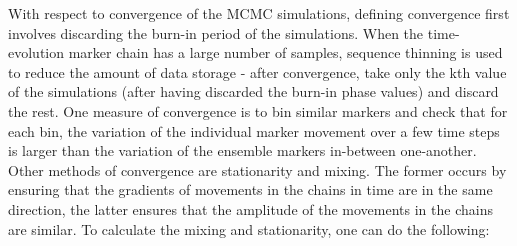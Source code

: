\documentclass[
]{article}
\begin{document}
With respect to convergence of the MCMC simulations, defining
convergence first involves discarding the burn-in period of the
simulations. When the time-evolution marker chain has a large number of
samples, sequence thinning is used to reduce the amount of data storage
- after convergence, take only the kth value of the simulations (after
having discarded the burn-in phase values) and discard the rest. One
measure of convergence is to bin similar markers and check that for each
bin, the variation of the individual marker movement over a few time
steps is larger than the variation of the ensemble markers in-between
one-another. Other methods of convergence are stationarity and mixing.
The former occurs by ensuring that the gradients of movements in the
chains in time are in the same direction, the latter ensures that the
amplitude of the movements in the chains are similar. To calculate the
mixing and stationarity, one can do the following:
\end{document}
